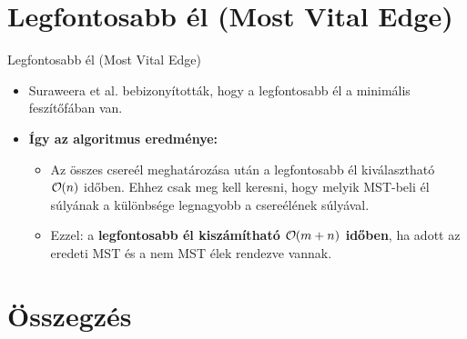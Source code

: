 \documentclass[aspectratio=169]{beamer}
\DeclareRobustCommand{\bigO}{
  \text{\usefont{OMS}{cmsy}{m}{n}O}
}
\begin{document}
\section{Legfontosabb él (Most Vital Edge)}
\begin{frame}{Legfontosabb él (Most Vital Edge)}
\small
\begin{itemize}
  \begin{block}{Definíció:}
    Egy összefüggő, súlyozott $G$ gráf legfontosabb éle, az az él, amelynek eltávolítása a legnagyobb növekedést eredményezi a minimális feszítőfa súlyában.  
  \end{block}
  \item Suraweera et al. bebizonyították, hogy a legfontosabb él a minimális feszítőfában van.
  \item \textbf{Így az algoritmus eredménye:}
    \begin{itemize}
      \item Az összes csereél meghatározása után a legfontosabb él kiválasztható $ \bigO (n)$ időben. Ehhez csak meg kell keresni, hogy melyik MST-beli él súlyának a különbsége legnagyobb a csereélének súlyával.
      \item Ezzel: a \textbf{legfontosabb él kiszámítható $ \bigO (m + n)$ időben}, ha adott az eredeti MST és a nem MST élek rendezve vannak.
    \end{itemize}
\end{itemize}
\end{frame}

\section{Összegzés}





\end{document}
